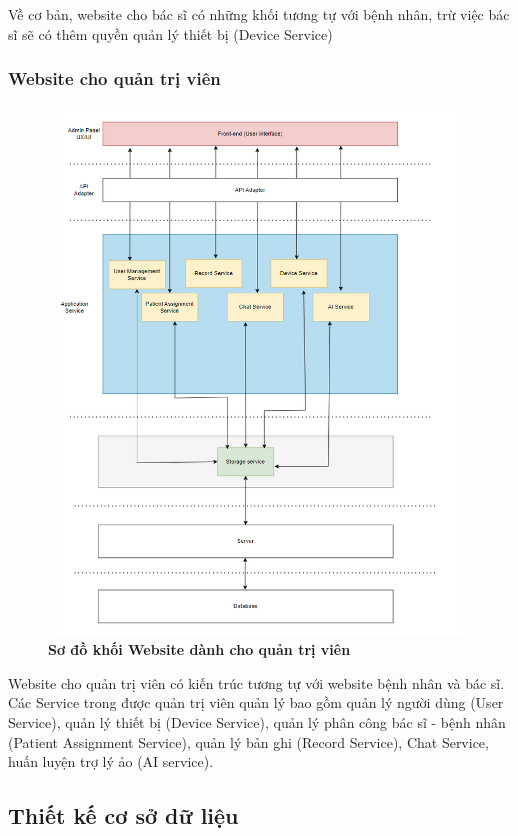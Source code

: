 Về cơ bản, website cho bác sĩ có những khối tương tự với bệnh nhân, trừ việc bác sĩ sẽ có thêm quyền quản lý thiết bị (Device Service)

\subsubsection{Website cho quản trị viên}

\begin{figure}[H]
  \centering
  \includegraphics[width=12cm,height=14cm]{Images/system/fmECG_architecture-Admin.drawio.png}
  \caption[Sơ đồ khối Website dành cho quản trị viên]{\bfseries \fontsize{12pt}{0pt}\selectfont Sơ đồ khối Website dành cho quản trị viên}
  \label{fmECG_architecture-Admin} %
\end{figure}

Website cho quản trị viên có kiến trúc tương tự với website bệnh nhân và bác sĩ. Các Service trong được quản trị viên quản lý bao gồm quản lý người dùng (User Service), quản lý thiết bị (Device Service), quản lý phân công
bác sĩ - bệnh nhân (Patient Assignment Service), quản lý bản ghi (Record Service), Chat Service, huấn luyện trợ lý ảo (AI service).
 
\newpage

\subsection{Thiết kế cơ sở dữ liệu}
\label{design_database}
